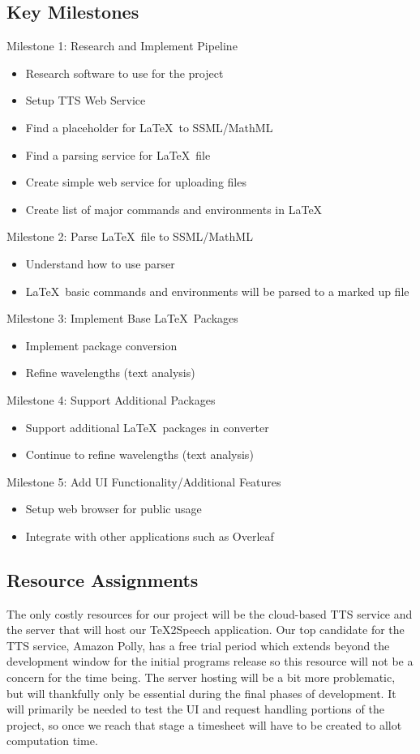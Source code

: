 \documentclass[letterpaper,12pt]{article}
\begin{document}
\subsection{Key Milestones}
Milestone 1: Research and Implement Pipeline
\begin{itemize}
    \itemsep0em
    \item Research software to use for the project
    \item Setup TTS Web Service
    \item Find a placeholder for \LaTeX\ to SSML/MathML
    \item Find a parsing service for \LaTeX\ file
    \item Create simple web service for uploading files
    \item Create list of major commands and environments in \LaTeX\
\end{itemize}
Milestone 2: Parse \LaTeX\ file to SSML/MathML
\begin{itemize}
    \itemsep0em
    \item Understand how to use parser
    \item \LaTeX\ basic commands and environments will be parsed to a marked up file
\end{itemize}
Milestone 3: Implement Base \LaTeX\ Packages
\begin{itemize}
    \itemsep0em
    \item Implement package conversion
    \item Refine wavelengths (text analysis)
\end{itemize}
Milestone 4: Support Additional Packages
\begin{itemize}
    \itemsep0em
    \item Support additional \LaTeX\ packages in converter
    \item Continue to refine wavelengths (text analysis)
\end{itemize}
Milestone 5: Add UI Functionality/Additional Features
\begin{itemize}
    \itemsep0em
    \item Setup web browser for public usage
    \item Integrate with other applications such as Overleaf
\end{itemize}

\subsection{Resource Assignments}
The only costly resources for our project will be the cloud-based TTS service and the server that will host our \TeX 2Speech application. Our top candidate for the TTS service, Amazon Polly, has a free trial period which extends beyond the development window for the initial programs release so this resource will not be a concern for the time being. The server hosting will be a bit more problematic, but will thankfully only be essential during the final phases of development. It will primarily be needed to test the UI and request handling portions of the project, so once we reach that stage a timesheet will have to be created to allot computation time.
\end{document}
